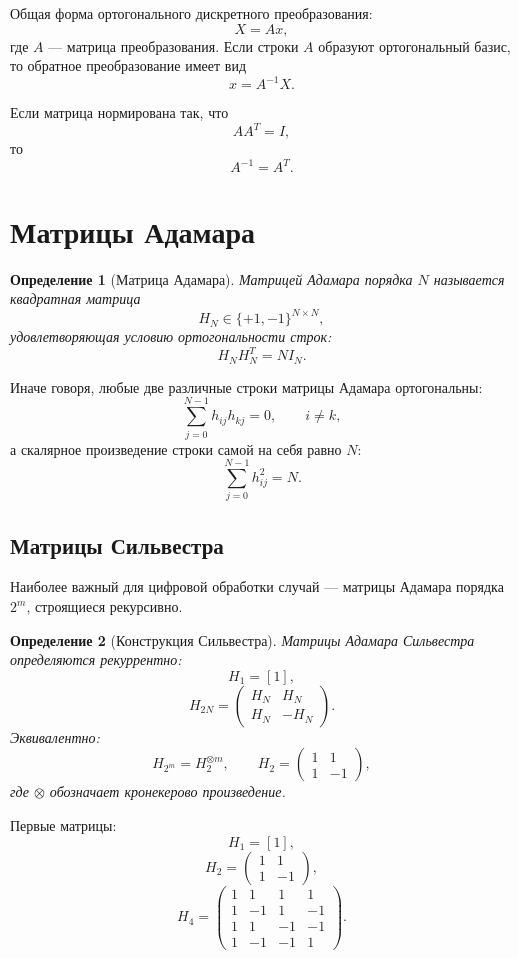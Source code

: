 \documentclass[12pt,a4paper]{article}
\newtheorem{definition}{Определение}
\begin{document}
Общая форма ортогонального дискретного преобразования:
\[
    X = A x,
\]
где $A$ --- матрица преобразования. Если строки $A$ образуют ортогональный базис, то обратное преобразование имеет вид
\[
    x = A^{-1}X.
\]

Если матрица нормирована так, что
\[
    A A^T = I,
\]
то
\[
    A^{-1}=A^T.
\]

\section{Матрицы Адамара}

\begin{definition}[Матрица Адамара]
Матрицей Адамара порядка $N$ называется квадратная матрица
\[
    H_N\in\{+1,-1\}^{N\times N},
\]
удовлетворяющая условию ортогональности строк:
\[
    H_N H_N^T = N I_N.
\]
\end{definition}

Иначе говоря, любые две различные строки матрицы Адамара ортогональны:
\[
    \sum_{j=0}^{N-1} h_{ij}h_{kj}=0,\qquad i\ne k,
\]
а скалярное произведение строки самой на себя равно $N$:
\[
    \sum_{j=0}^{N-1} h_{ij}^2=N.
\]

\subsection{Матрицы Сильвестра}

Наиболее важный для цифровой обработки случай --- матрицы Адамара порядка $2^m$, строящиеся рекурсивно.

\begin{definition}[Конструкция Сильвестра]
Матрицы Адамара Сильвестра определяются рекуррентно:
\[
    H_1 = [1],
\]
\[
    H_{2N}
    =
    \begin{pmatrix}
        H_N & H_N\\
        H_N & -H_N
    \end{pmatrix}.
\]
Эквивалентно:
\[
    H_{2^m}
    =
    H_2^{\otimes m},
    \qquad
    H_2=
    \begin{pmatrix}
        1 & 1\\
        1 & -1
    \end{pmatrix},
\]
где $\otimes$ обозначает кронекерово произведение.
\end{definition}

Первые матрицы:
\[
H_1=[1],
\]
\[
H_2=
\begin{pmatrix}
1&1\\
1&-1
\end{pmatrix},
\]
\[
H_4=
\begin{pmatrix}
1&1&1&1\\
1&-1&1&-1\\
1&1&-1&-1\\
1&-1&-1&1
\end{pmatrix}.
\]
\end{document}
